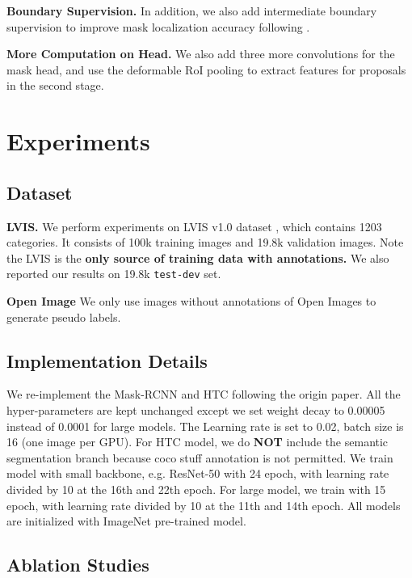 \documentclass[runningheads]{llncs}
\begin{document}
  \noindent \textbf{Boundary Supervision.} In addition, we also add intermediate boundary supervision to improve mask localization accuracy following \cite{chengwhl20}.
 
   \noindent \textbf{More Computation on Head.} We also add three more convolutions for the mask head, and use the deformable RoI pooling to extract features for proposals in the second stage.
 
 \section{Experiments}
 
 \subsection{Dataset}
 
 \noindent \textbf{LVIS.} We perform experiments on LVIS v1.0 dataset \cite{gupta2019lvis}, which contains 1203 categories. It consists of 100k training images and 19.8k validation images. Note the LVIS is the \textbf{only source of training data with annotations.} We also reported our results on 19.8k \texttt{test-dev} set.
 
 \noindent \textbf{Open Image} We only use images without annotations of Open Images \cite{Kuznetsova_2020} to generate pseudo labels.
 
 \subsection{Implementation Details}

We re-implement the Mask-RCNN \cite{He_2017_ICCV} and HTC \cite{chen2019hybrid} following the origin paper. All the hyper-parameters are kept unchanged except we set weight decay to 0.00005 instead of 0.0001 for large models. The Learning rate is set to 0.02, batch size is 16 (one image per GPU). For HTC  model, we do \textbf{NOT} include the semantic segmentation branch because coco stuff annotation is not permitted. We train model with small backbone, e.g. ResNet-50 \cite{he2016deep} with 24 epoch, with learning rate divided by 10 at the 16th and 22th epoch. For large model, we train with 15 epoch, with learning rate divided by 10 at the 11th and 14th epoch. All models are initialized with ImageNet pre-trained model. 
 
 \subsection{Ablation Studies}
 
\end{document}
